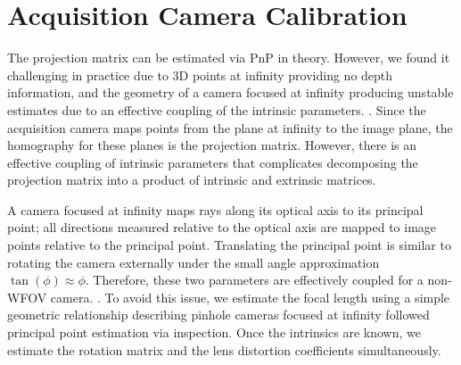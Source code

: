 \section{Acquisition Camera Calibration}
The projection matrix can be estimated via PnP in theory. However, we found it challenging in practice due to 3D points at infinity providing no depth information, and the geometry of a camera focused at infinity producing unstable estimates due to an effective coupling of the intrinsic parameters. . Since the acquisition camera maps points from the plane at infinity to the image plane, the homography for these planes is the projection matrix. However, there is an effective coupling of intrinsic parameters that complicates decomposing the projection matrix into a product of intrinsic and extrinsic matrices. 

A camera focused at infinity maps rays along its optical axis to its principal point; all directions measured relative to the optical axis are mapped to image points relative to the principal point. Translating the principal point is similar to rotating the camera externally under the small angle approximation $\tan(\phi) \approx \phi$. Therefore, these two parameters are effectively coupled for a non-WFOV camera. . To avoid this issue, we estimate the focal length using a simple geometric relationship describing pinhole cameras focused at infinity followed principal point estimation via inspection. Once the intrinsics are known, we estimate the rotation matrix and the lens distortion coefficients simultaneously.

